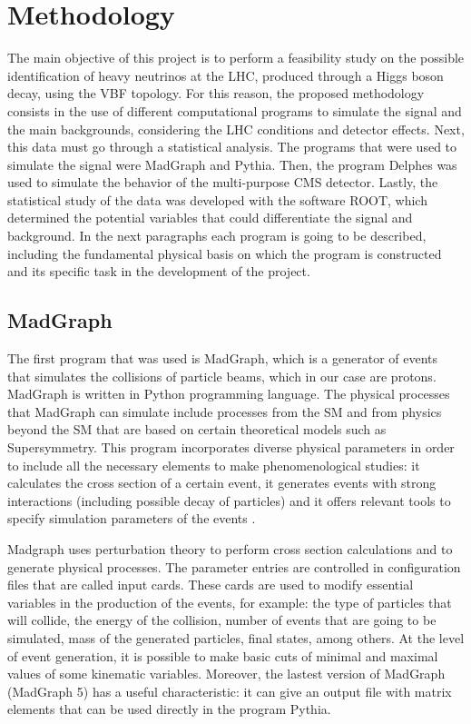 \chapter{Methodology} 
\label{Methodology_chapter}

The main objective of this project is to perform a feasibility study on the possible identification of heavy neutrinos at the LHC, produced through a Higgs boson decay, using the VBF topology. For this reason, the proposed methodology consists in the use of different computational programs to simulate the signal and the main backgrounds, considering the LHC conditions and detector effects. Next, this data must go through a statistical analysis. The programs that were used to simulate the signal were MadGraph and Pythia. Then, the program Delphes was used to simulate the behavior of the multi-purpose CMS detector. Lastly, the statistical study of the data was developed with the software ROOT, which determined the potential variables that could differentiate the signal and background. In the next paragraphs each program is going to be described, including the fundamental physical basis on which the program is constructed and its specific task in the development of the project.

\section{MadGraph}

The first program that was used is MadGraph, which is a generator of events that simulates the collisions of particle beams, which in our case are protons. MadGraph is written in Python programming 
language. The physical processes that MadGraph can simulate include processes from the SM and from physics beyond the SM that are based on certain theoretical models such as Supersymmetry. This 
program incorporates diverse physical parameters in order to include all the necessary elements to make phenomenological studies: it calculates the cross section of a certain event, it generates 
events with strong interactions (including possible decay of particles) and it offers relevant tools to specify simulation parameters of the events \cite{MadGraph 1}. 

Madgraph uses perturbation theory to perform cross section calculations and to generate physical processes. The parameter entries are controlled in configuration files that are called input cards. 
These cards are used to modify essential variables in the production of the events, for example: the type of particles that will collide, the energy of the collision, number of events that are going
to be simulated, mass of the generated particles, final states, among others. At the level of event generation, it is possible to make basic cuts of minimal and maximal values of some kinematic
variables. Moreover, the lastest version of MadGraph (MadGraph 5) has a useful characteristic: it can give an output file with matrix elements that can be used directly in the program Pythia. 

